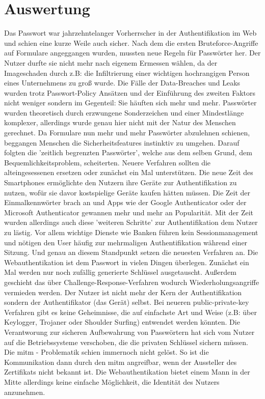 \chapter{Auswertung}
Das Passwort war jahrzehntelanger Vorherrscher in der Authentifikation im Web und schien eine kurze Weile auch sicher. Nach dem die ersten Bruteforce-Angriffe auf Formulare angeggangen wurden, mussten neue Regeln für Passwörter her. Der Nutzer durfte sie nicht mehr nach eigenem Ermessen wählen, da der Imageschaden durch z.B: die Infiltrierung einer wichtigen hochrangigen Person eines Unternehmens zu groß wurde. Die Fälle der Data-Breaches und Leaks wurden trotz Passwort-Policy Ansätzen und der Einführung des zweiten Faktors nicht weniger sondern im Gegenteil: Sie häuften sich mehr und mehr. Passwörter wurden theoretisch durch erzwungene Sonderzeichen und einer Mindestlänge komplexer, allerdings wurde genau hier nicht mit der Natur des Menschen gerechnet. Da Formulare nun mehr und mehr Passwörter abzulehnen schienen, beggangen Menschen die Sicherheitsfeatures instinktiv zu umgehen. Darauf folgten die 'zeitlich begrenzten Passwörter', welche aus dem selben Grund, dem Bequemlichkeitsproblem, scheiterten. Neuere Verfahren sollten die alteingesessenen ersetzen oder zunächst ein Mal unterstützen. Die neue Zeit des Smartphones ermöglichte den Nutzern ihre Geräte zur Authentifikation zu nutzen, wofür sie davor kostspielige Geräte kaufen hätten müssen. Die Zeit der Einmalkennwörter brach an und Apps wie der Google Authenticator oder der Microsoft Authenticator gewannen mehr und mehr an Popularität. Mit der Zeit wurden allerdings auch diese 'weiteren Schritte' zur Authentifikation dem Nutzer zu lästig. Vor allem wichtige Dienste wie Banken führen kein Sessionmanagement und nötigen den User häufig zur mehrmaligen Authentifikation während einer Sitzung. Und genau an diesem Standpunkt setzen die neuesten Verfahren an. Die Webauthentikation ist dem Passwort in vielen Dingen überlegen. Zunächst ein Mal werden nur noch zufällig generierte Schlüssel ausgetauscht. Außerdem geschieht das über Challenge-Response-Verfahren wodurch Wiederholungsangriffe vermieden werden. Der Nutzer ist nicht mehr der Kern der Authentifikation sondern der Authentifikator (das Gerät) selbst. Bei neueren public-private-key Verfahren gibt es keine Geheimnisse, die auf einfachste Art und Weise (z.B: über Keylogger, Trojaner oder Shoulder Surfing) entwendet werden könnten. Die Verantworung zur sicheren Aufbewahrung von Passwörtern hat sich vom Nutzer auf die Betriebssysteme verschoben, die die privaten Schlüssel sichern müssen. Die \ac{mitm} - Problematik schien immernoch nicht gelöst. So ist die Kommunikation dann durch den \ac{mitm} angreifbar, wenn der Aussteller des Zertifikats nicht bekannt ist. Die Webauthentikation bietet einem Mann in der Mitte allerdings keine einfache Möglichkeit, die Identität des Nutzers anzunehmen.
\newpage

